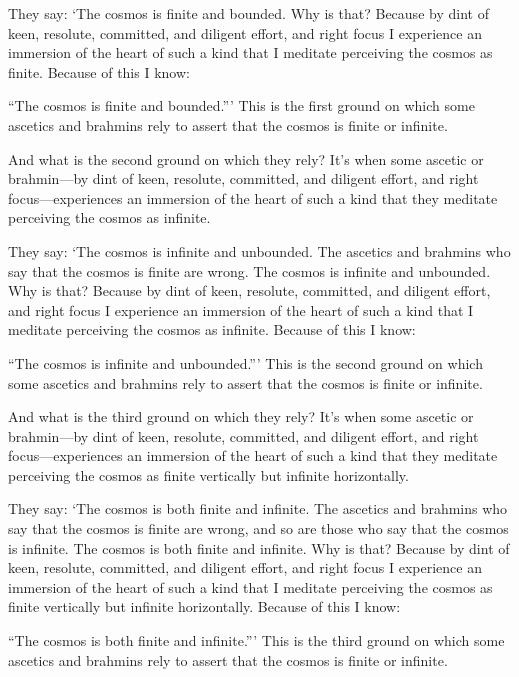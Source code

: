 \documentclass[12pt,openany]{book}%
\begin{document}
They say: ‘The cosmos is finite and bounded. Why is that? Because by dint of keen, resolute, committed, and diligent effort, and right focus I experience an immersion of the heart of such a kind that I meditate perceiving the cosmos as finite. Because of this I know: 

“The cosmos is finite and bounded.”’ This is the first ground on which some ascetics and brahmins rely to assert that the cosmos is finite or infinite. 

And what is the second ground on which they rely? It’s when some ascetic or brahmin—by dint of keen, resolute, committed, and diligent effort, and right focus—experiences an immersion of the heart of such a kind that they meditate perceiving the cosmos as infinite. 

They say: ‘The cosmos is infinite and unbounded. The ascetics and brahmins who say that the cosmos is finite are wrong. The cosmos is infinite and unbounded. Why is that? Because by dint of keen, resolute, committed, and diligent effort, and right focus I experience an immersion of the heart of such a kind that I meditate perceiving the cosmos as infinite. Because of this I know: 

“The cosmos is infinite and unbounded.”’ This is the second ground on which some ascetics and brahmins rely to assert that the cosmos is finite or infinite. 

And what is the third ground on which they rely? It’s when some ascetic or brahmin—by dint of keen, resolute, committed, and diligent effort, and right focus—experiences an immersion of the heart of such a kind that they meditate perceiving the cosmos as finite vertically but infinite horizontally. 

They say: ‘The cosmos is both finite and infinite. The ascetics and brahmins who say that the cosmos is finite are wrong, and so are those who say that the cosmos is infinite. The cosmos is both finite and infinite. Why is that? Because by dint of keen, resolute, committed, and diligent effort, and right focus I experience an immersion of the heart of such a kind that I meditate perceiving the cosmos as finite vertically but infinite horizontally. Because of this I know: 

“The cosmos is both finite and infinite.”’ This is the third ground on which some ascetics and brahmins rely to assert that the cosmos is finite or infinite. 
\end{document}
